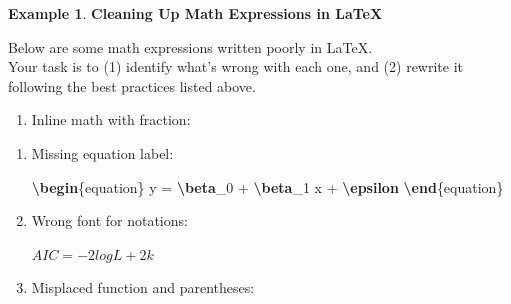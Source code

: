 \documentclass[
]{book}
\newenvironment{Shaded}{\begin{snugshade}}{\end{snugshade}}
\newcommand{\ExtensionTok}[1]{#1}
\newcommand{\KeywordTok}[1]{\textcolor[rgb]{0.13,0.29,0.53}{\textbf{#1}}}
\newcommand{\NormalTok}[1]{#1}
\newcommand{\SpecialCharTok}[1]{\textcolor[rgb]{0.81,0.36,0.00}{\textbf{#1}}}
\newcommand{\SpecialStringTok}[1]{\textcolor[rgb]{0.31,0.60,0.02}{#1}}
\providecommand{\tightlist}{%
  \setlength{\itemsep}{0pt}\setlength{\parskip}{0pt}}
\theoremstyle{definition}
\theoremstyle{definition}
\newtheorem{example}{Example}[chapter]
\theoremstyle{definition}
\theoremstyle{definition}
\theoremstyle{remark}
\begin{document}
\begin{example}

\textbf{Cleaning Up Math Expressions in LaTeX}

Below are some math expressions written poorly in LaTeX.\\
Your task is to (1) identify what's wrong with each one, and (2) rewrite it
following the best practices listed above.

\begin{enumerate}
\def\labelenumi{\arabic{enumi}.}
\tightlist
\item
  Inline math with fraction:\\
\end{enumerate}

\begin{Shaded}
\end{Shaded}

\begin{enumerate}
\def\labelenumi{\arabic{enumi}.}
\setcounter{enumi}{1}
\item
  Missing equation label:

\begin{Shaded}
\begin{Highlighting}[]
\KeywordTok{\textbackslash{}begin}\NormalTok{\{}\ExtensionTok{equation}\NormalTok{\}}
\SpecialStringTok{y = }\SpecialCharTok{\textbackslash{}beta}\SpecialStringTok{\_0 + }\SpecialCharTok{\textbackslash{}beta}\SpecialStringTok{\_1 x + }\SpecialCharTok{\textbackslash{}epsilon}
\KeywordTok{\textbackslash{}end}\NormalTok{\{}\ExtensionTok{equation}\NormalTok{\}}
\end{Highlighting}
\end{Shaded}
\item
  Wrong font for notations:

\begin{Shaded}
\begin{Highlighting}[]
\SpecialStringTok{$ AIC = {-}2logL + 2k $}
\end{Highlighting}
\end{Shaded}
\item
  Misplaced function and parentheses:

\begin{Shaded}
\end{Shaded}
\end{enumerate}

\end{example}
\end{document}
